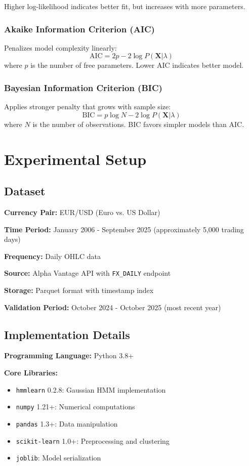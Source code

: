 \documentclass[conference]{IEEEtran}
\begin{document}
Higher log-likelihood indicates better fit, but increases with more parameters.

\subsubsection{Akaike Information Criterion (AIC)}
Penalizes model complexity linearly:
\begin{equation}
\text{AIC} = 2p - 2\log P(\mathbf{X}|\lambda)
\end{equation}
where $p$ is the number of free parameters. Lower AIC indicates better model.

\subsubsection{Bayesian Information Criterion (BIC)}
Applies stronger penalty that grows with sample size:
\begin{equation}
\text{BIC} = p\log N - 2\log P(\mathbf{X}|\lambda)
\end{equation}
where $N$ is the number of observations. BIC favors simpler models than AIC.

\section{Experimental Setup}

\subsection{Dataset}

\textbf{Currency Pair:} EUR/USD (Euro vs. US Dollar)

\textbf{Time Period:} January 2006 - September 2025 (approximately 5,000 trading days)

\textbf{Frequency:} Daily OHLC data

\textbf{Source:} Alpha Vantage API with \texttt{FX\_DAILY} endpoint

\textbf{Storage:} Parquet format with timestamp index

\textbf{Validation Period:} October 2024 - October 2025 (most recent year)

\subsection{Implementation Details}

\textbf{Programming Language:} Python 3.8+

\textbf{Core Libraries:}
\begin{itemize}
\item \texttt{hmmlearn} 0.2.8: Gaussian HMM implementation
\item \texttt{numpy} 1.21+: Numerical computations
\item \texttt{pandas} 1.3+: Data manipulation
\item \texttt{scikit-learn} 1.0+: Preprocessing and clustering
\item \texttt{joblib}: Model serialization
\end{itemize}
\end{document}
